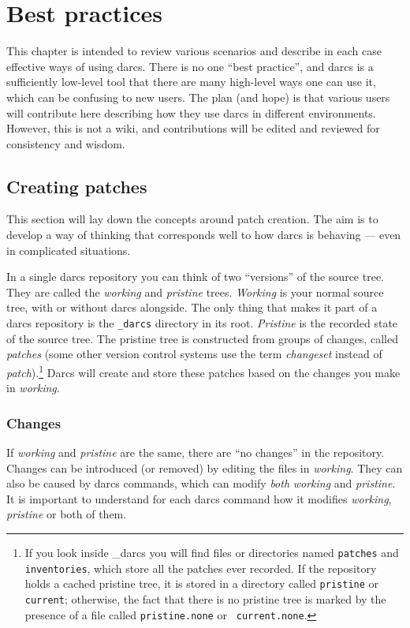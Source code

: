  

\chapter{Best practices}

This chapter is intended to review various scenarios and describe in each
case effective ways of using darcs.  There is no one ``best practice'', and
darcs is a sufficiently low-level tool that there are many high-level ways
one can use it, which can be confusing to new users.  The plan (and hope)
is that various users will contribute here describing how they use darcs in
different environments.  However, this is not a wiki, and contributions
will be edited and reviewed for consistency and wisdom.


\section{Creating patches}

This section will lay down the concepts around patch creation.
The aim is to develop a way of thinking
that corresponds well to how darcs is behaving
--- even in complicated situations.

	In a single darcs repository you can think of two ``versions'' of the source tree.
	They are called the \emph{working} and \emph{pristine} trees.
    \emph{Working} is your normal source tree, with or without darcs alongside.
	The only thing that makes it part of a darcs repository
	is the \verb!_darcs! directory in its root.
    \emph{Pristine} is the recorded state of the source tree.
	The pristine tree is constructed from groups of changes,
        called {\em patches\/} (some other version control systems use the
	term {\em changeset\/} instead of {\em patch\/}).\footnote{If
	you look inside \_darcs you will find files or directories named
	{\tt patches} and {\tt inventories}, which store all the patches
          ever recorded.  If the repository holds a cached pristine tree, it
          is stored in a directory called {\tt pristine} or {\tt current\/};
          otherwise, the fact that there is no pristine tree is marked
          by the presence of a file called {\tt pristine.none} or {\tt
            current.none}.}
	Darcs will create and store these patches
	based on the changes you make in \emph{working}.


\subsection{Changes}
	If \emph{working} and \emph{pristine} are the same,
	there are ``no changes'' in the repository.
	Changes can be introduced (or removed) by editing the files in \emph{working}.
	They can also be caused by darcs commands,
	which can modify \emph{both} \emph{working} and \emph{pristine}.
	It is important to understand for each darcs command
	how it modifies \emph{working}, \emph{pristine} or both of them.

